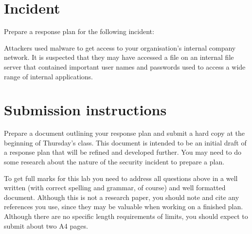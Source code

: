 \documentclass{article}
\begin{document}
\newpage 

\section{Incident}
Prepare a response plan for the following incident:

Attackers used malware to get access to your organisation's internal company network.  It is suspected that they may have accessed a file on an internal file server that contained important user names and passwords used to access a wide range of internal applications.

\section{Submission instructions}
Prepare a document outlining your response plan and submit a hard copy at the beginning of Thursday's class.  This document is intended to be an initial draft of a response plan that will be refined and developed further.  You may need to do some research about the nature of the security incident to prepare a plan.

To get full marks for this lab you need to address all questions above in a well written (with correct spelling and grammar, of course) and well formatted document. Although this is not a research paper, you should note and cite any references you use, since they may be valuable when working on a finished plan. Although there are no specific length requirements of limits, you should expect to submit about two A4 pages.
 
\end{document}
